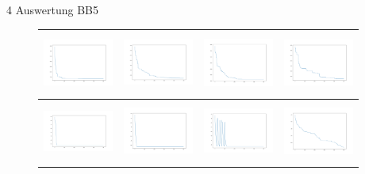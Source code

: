 \documentclass{ocbeameruni}
\begin{document}
\begin{frame}{4 Auswertung BB5}
    \begin{center}
    \begin{figure}
    \begin{tabular}{|c|c|c|c|} 
      \hline
      \includegraphics[width=23mm, height=20mm]{plots/bb5_naive.png} 
    & \includegraphics[width=23mm, height=20mm]{plots/bb5_ga_simple.png} 
    & \includegraphics[width=23mm, height=20mm]{plots/bb5_ga_gray.png}
    & \includegraphics[width=23mm, height=20mm]{plots/bb5_ga_float.png} \\ \hline
      \includegraphics[width=23mm, height=20mm]{plots/bb5_hc.png} 
    & \includegraphics[width=23mm, height=20mm]{plots/bb5_hc_sa.png} 
    & \includegraphics[width=23mm, height=20mm]{plots/bb5_hc_rs.png}
    & \includegraphics[width=23mm, height=20mm]{plots/bb5_sa.png} \\ \hline

\end{tabular}
\end{figure}
\end{center}
\end{frame}
\end{document}
